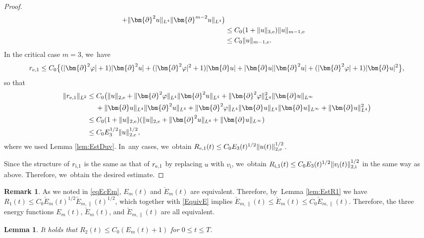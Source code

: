 \documentclass[JEP,XML,SOM,Unicode,NoFloatCountersInSection,published]{cedram}
\newtheorem{lemma}[theorem]{Lemma}
\theoremstyle{definition}
\newtheorem{remark}[theorem]{Remark}
\begin{document}
\begin{proof}
\begin{align*}
+ \|\bm{\partial}^2u\|_{L^4}\|\bm{\partial}^{m-2}u\|_{L^4} \bigr) \\
&\leq C_0(1+\|u\|_{3,{\rm e}})\|u\|_{m-1,{\rm e}} \\
&\leq C_0\|u\|_{m-1,{\rm e}}.
\end{align*}
In the critical case $m=3$, we~have
\[
r_{{\rm e},1}
\leq C_0 \bigl\{ (|\bm{\partial}^2\varphi|+1)|\bm{\partial}^2u| + (|\bm{\partial}^2\varphi|^2+1)|\bm{\partial}u|
+ |\bm{\partial}u||\bm{\partial}^2u| + (|\bm{\partial}^2\varphi|+1)|\bm{\partial}u|^2\bigr\},
\]
so that
\begin{align*}
\|r_{{\rm e},1}\|_{L^2}
&\leq C_0 \bigl(\|u\|_{2,{\rm e}} + \|\bm{\partial}^2\varphi\|_{L^4}\|\bm{\partial}^2u\|_{L^4} + \|\bm{\partial}^2\varphi\|_{L^4}^2\|\bm{\partial}u\|_{L^\infty} \\
&\quad\;
+ \|\bm{\partial}u\|_{L^4}\|\bm{\partial}^2u\|_{L^4} + \|\bm{\partial}^2\varphi\|_{L^4}\|\bm{\partial}u\|_{L^4}\|\bm{\partial}u\|_{L^\infty}
+ \|\bm{\partial}u\|_{L^4}^2 \bigr) \\
&\leq C_0 (1+\|u\|_{2,{\rm e}})(\|u\|_{2,{\rm e}}+\|\bm{\partial}^2u\|_{L^4}+\|\bm{\partial}u\|_{L^\infty}) \\
&\leq C_0 E_3^{1/2} \|u\|_{2,{\rm e}}^{1/2},
\end{align*}
where we used Lemma \ref{lem:EstDuv}. In~any cases, we~obtain $R_{{\rm e},1}(t) \leq C_0 E_3(t)^{1/2} \|u(t)\|_{2,{\rm e}}^{1/2}$.

Since the structure of $r_{{\rm i},1}$ is the same as that of $r_{{\rm e},1}$ by replacing $u$ with $v_\mathrm{i}$, we~obtain $R_{{\rm i},1}(t) \leq C_0 E_3(t)^{1/2} \|v_\mathrm{i}(t)\|_{2,{\rm i}}^{1/2}$ in the same way as above.
Therefore, we~obtain the desired estimate.
\end{proof}

\begin{remark}\label{re:EFs}
As we noted in \eqref{eqEcEm}, $E_m(t)$ and $\check{E}_m(t)$ are equivalent.
Therefore, by~Lemma \ref{lem:EstR1} we have $R_1(t) \leq C_0\check{E}_m(t)^{1/2}\check{E}_{m,\parallel}(t)^{1/2}$,
which together with \eqref{EquivE} implies $\check{E}_{m,\parallel}(t) \leq \check{E}_m(t) \leq C_0\check{E}_{m,\parallel}(t)$.
Therefore, the three energy functions $E_m(t)$, $\check{E}_m(t)$, and $\check{E}_{m,\parallel}(t)$ are all equivalent.
\end{remark}

\begin{lemma}\label{lem:EstR2}
It holds that $R_2(t) \leq C_0(E_m(t)+1)$ for $0\leq t\leq T$.
\end{lemma}
\end{document}
